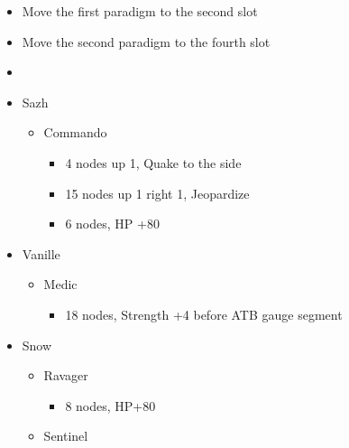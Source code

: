 \begin{menu}
	\begin{multicols}{2}
		\begin{itemize}
			\paradigm
			\begin{itemize}
				\item Move the first paradigm to the second slot
				\item Move the second paradigm to the fourth slot
				\item {}%
				      {\paradigmline{(\syn)}{\sab}{\rav}}%
				      {\paradigmline{\com}{\sab}{\com}}%
				      {\paradigmline{\syn}{\med}{\com}}%
				      {\paradigmline{\com}{\med}{\com}}%
				      {\paradigmline[5]{\textit{\syn}}{\textit{\sab}}{\textit{\com}}}%
				      {\paradigmline{\com}{\rav}{\com}}
			\end{itemize}
			\crystarium
			\begin{itemize}
				\item Sazh
				      \begin{itemize}
					      \item Commando
					            \begin{itemize}
						            \item 4 nodes up 1, Quake to the side
						            \item 15 nodes up 1 right 1, Jeopardize
						            \item 6 nodes, HP +80
					            \end{itemize}
				      \end{itemize}
				\item Vanille
				      \begin{itemize}
					      \item Medic
					            \begin{itemize}
						            \item 18 nodes, Strength +4 before ATB gauge segment
					            \end{itemize}
				      \end{itemize}
				\item Snow
				      \begin{itemize}
					      \item Ravager
					            \begin{itemize}
						            \item 8 nodes, HP+80
					            \end{itemize}
					      \item Sentinel

\end{itemize}
\end{itemize}
\end{itemize}
\end{multicols}
\end{menu}
